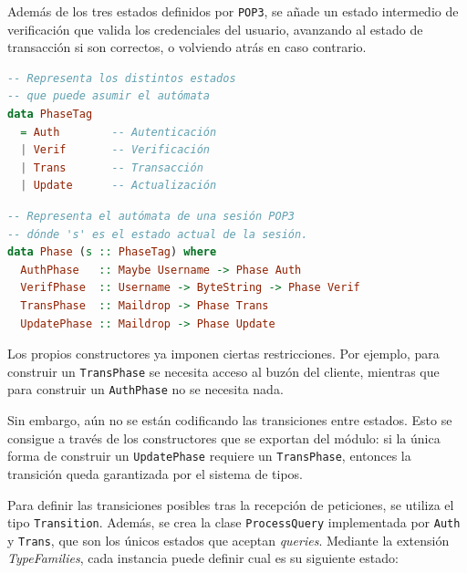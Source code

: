 \documentclass[a4paper]{CSMakotoTechnicalReport}
\begin{document}
Además de los tres estados definidos por \texttt{POP3}, se añade un estado intermedio de verificación que valida los credenciales del usuario, avanzando al estado de transacción si son correctos, o volviendo atrás en caso contrario. 

\vspace{-20pt}
\begin{minipage}[t]{0.40\textwidth}
\begin{lstlisting}[language=Haskell, frame=none, numbers=none, basicstyle=\footnotesize]
-- Representa los distintos estados
-- que puede asumir el autómata
data PhaseTag
  = Auth        -- Autenticación
  | Verif       -- Verificación
  | Trans       -- Transacción
  | Update      -- Actualización
\end{lstlisting}
\vspace{-4pt}
\captionsetup{type=lstlisting}
\caption{Defnición de los estados.}
\end{minipage}
\hfill
\begin{minipage}[t]{0.55\textwidth}
\begin{lstlisting}[language=Haskell, frame=none, numbers=none, basicstyle=\footnotesize]
-- Representa el autómata de una sesión POP3
-- dónde 's' es el estado actual de la sesión.
data Phase (s :: PhaseTag) where
  AuthPhase   :: Maybe Username -> Phase Auth
  VerifPhase  :: Username -> ByteString -> Phase Verif
  TransPhase  :: Maildrop -> Phase Trans
  UpdatePhase :: Maildrop -> Phase Update
\end{lstlisting}
\vspace{-4pt}
\captionsetup{type=lstlisting}
\caption{Definición del autómata con un GADT.}
\end{minipage}
\vspace{6pt}

Los propios constructores ya imponen ciertas restricciones. Por ejemplo, para construir un \texttt{TransPhase} se necesita acceso al buzón del cliente, mientras que para construir un \texttt{AuthPhase} no se necesita nada.

Sin embargo, aún no se están codificando las transiciones entre estados. Esto se consigue a través de los constructores que se exportan del módulo: si la única forma de construir un \texttt{UpdatePhase} requiere un \texttt{TransPhase}, entonces la transición queda garantizada por el sistema de tipos.

Para definir las transiciones posibles tras la recepción de peticiones, se utiliza el tipo \texttt{Transition}. Además, se crea la clase \texttt{ProcessQuery} implementada por \texttt{Auth} y \texttt{Trans}, que son los únicos estados que aceptan \textit{queries}. Mediante la extensión \textit{TypeFamilies}, cada instancia puede definir cual es su siguiente estado:
\end{document}
